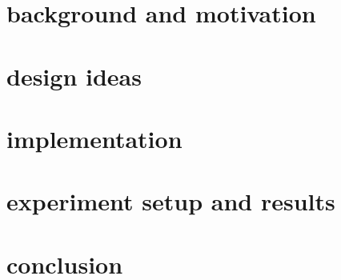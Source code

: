 \documentclass[conference]{IEEEtran}
\begin{document}
\section{background and motivation}

\section{design ideas}

\section{implementation}

\section{experiment setup and results}

\section{conclusion}





\end{document}
